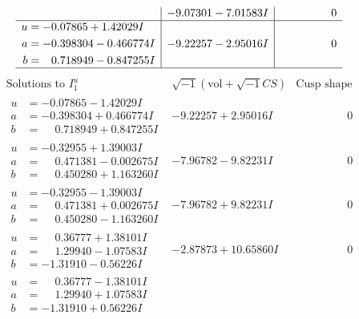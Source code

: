 \documentclass[1p]{elsarticle_modified}
\theoremstyle{definition}
\newcommand{\I}{\sqrt{-1}}
\begin{document}
$$\begin{array}{c|c|c}
 & -9.07301 - 7.01583 I & \phantom{-0.000000 } 0 \\ \hline\begin{aligned}
u &= -0.07865 + 1.42029 I \\
a &= -0.398304 - 0.466774 I \\
b &= \phantom{-}0.718949 - 0.847255 I\end{aligned}
 & -9.22257 - 2.95016 I & \phantom{-0.000000 } 0\\
 \hline 
 \end{array}$$\newpage$$\begin{array}{c|c|c}  
\text{Solutions to }I^u_{1}& \I (\text{vol} + \sqrt{-1}CS) & \text{Cusp shape}\\
 \hline 
\begin{aligned}
u &= -0.07865 - 1.42029 I \\
a &= -0.398304 + 0.466774 I \\
b &= \phantom{-}0.718949 + 0.847255 I\end{aligned}
 & -9.22257 + 2.95016 I & \phantom{-0.000000 } 0 \\ \hline\begin{aligned}
u &= -0.32955 + 1.39003 I \\
a &= \phantom{-}0.471381 - 0.002675 I \\
b &= \phantom{-}0.450280 + 1.163260 I\end{aligned}
 & -7.96782 - 9.82231 I & \phantom{-0.000000 } 0 \\ \hline\begin{aligned}
u &= -0.32955 - 1.39003 I \\
a &= \phantom{-}0.471381 + 0.002675 I \\
b &= \phantom{-}0.450280 - 1.163260 I\end{aligned}
 & -7.96782 + 9.82231 I & \phantom{-0.000000 } 0 \\ \hline\begin{aligned}
u &= \phantom{-}0.36777 + 1.38101 I \\
a &= \phantom{-}1.29940 - 1.07583 I \\
b &= -1.31910 - 0.56226 I\end{aligned}
 & -2.87873 + 10.65860 I & \phantom{-0.000000 } 0 \\ \hline\begin{aligned}
u &= \phantom{-}0.36777 - 1.38101 I \\
a &= \phantom{-}1.29940 + 1.07583 I \\
b &= -1.31910 + 0.56226 I\end{aligned}

\end{array}$$
\end{document}
